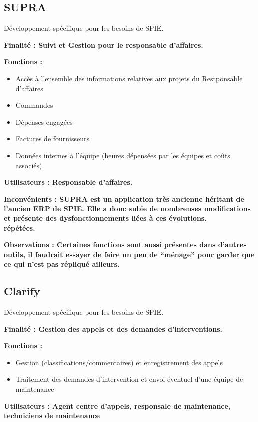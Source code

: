 \subsection{SUPRA}
Développement spécifique pour les besoins de SPIE.
\begin{description}
    \item \bf{Finalité :} Suivi et Gestion pour le responsable d’affaires. \\
    \item \bf{Fonctions :}
    \begin{itemize}
        \item Accès à l’ensemble des informations relatives aux projets du Restponsable d’affaires
        \item Commandes
        \item Dépenses engagées
        \item Factures de fournisseurs
        \item Données internes à l’équipe (heures dépensées par les équipes et coûts associés) \\
    \end{itemize}
    \item \bf{Utilisateurs :} Responsable d’affaires. \\
    \item \bf{Inconvénients :} SUPRA est un application très ancienne héritant de l’ancien ERP de SPIE. Elle a donc subie de nombreuses modifications et présente des dysfonctionnements liées à ces évolutions. \\ répétées. 
\end{description}

\bf{Observations :} Certaines fonctions sont aussi présentes dans d’autres outils, il faudrait essayer de faire un peu de “ménage” pour garder que ce qui n’est pas répliqué ailleurs.


\subsection{Clarify}
Développement spécifique pour les besoins de SPIE.
\begin{description}
    \item \bf{Finalité :} Gestion des appels et des demandes d’interventions. \\
    \item \bf{Fonctions :} 
    \begin{itemize}
        \item Gestion (classifications/commentaires) et enregistrement des appels
        \item Traitement des demandes d’intervention et envoi éventuel d’une équipe de maintenance \\
    \end{itemize}
    \item \bf{Utilisateurs :} Agent centre d’appels, responsale de maintenance, techniciens de maintenance
\end{description}

